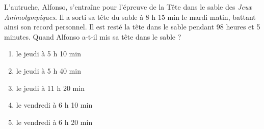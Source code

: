 L'autruche, Alfonso, s'entraîne pour l'épreuve de la Tête dans le sable
des {\em Jeux Animolympiques}. Il a sorti sa tête du sable à 8 h 15 min le mardi matin, battant ainsi son record personnel. Il est resté la tête dans le sable pendant 98 heures et 5 minutes. Quand Alfonso a-t-il mis sa tête dans le sable ?
\begin{multicols}{2}
  \begin{enumerate}[A/]
  \item le jeudi à 5 h 10 min
  \item le jeudi à 5 h 40 min
  \item le jeudi à 11 h 20 min
  \item le vendredi à 6 h 10 min
  \item le vendredi à 6 h 20 min
  \end{enumerate}
\end{multicols}